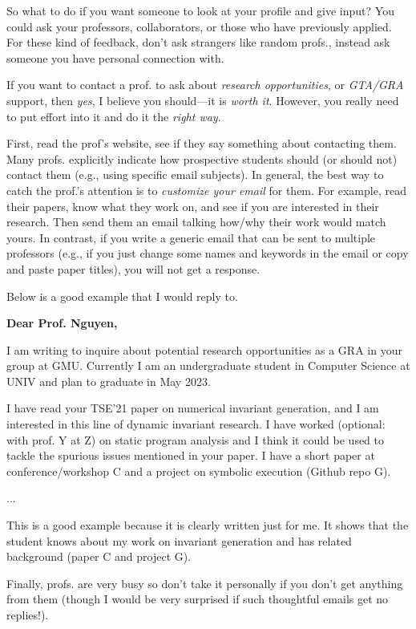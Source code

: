 \documentclass[oneside,11pt]{memoir}
\newenvironment{commentbox}[1][]{
  \small
  \begin{mybox}
    {\small \textbf{#1}}
  }{
  \end{mybox}
}
\begin{document}
So what to do if you want someone to look at your profile and give input? You could ask your professors, collaborators, or those who have previously applied. For these kind of feedback,  don't ask strangers like random profs., instead ask someone you have personal connection with.  

If you want to contact a prof. to ask about \emph{research opportunities}, or \emph{GTA/GRA} support, then \emph{yes}, I believe you should---it is \emph{worth it}. However, you really need to put effort into it and do it the \emph{right way}.

First, read the prof's website, see if they say something about contacting them. Many profs. explicitly indicate how prospective students should (or should not) contact them (e.g., using specific email subjects).
In general, the best way to catch the prof.'s attention is to \emph{customize your email} for them.  For example, read their papers, know what they work on, and see if you are interested in their research. Then send them an email talking how/why their work would match yours.
In contrast, if you write a generic email that can be sent to multiple professors (e.g., if you just change some names and keywords in the email or copy and paste paper titles), you will not get a response.

Below is a good example that I would reply to.   

\begin{commentbox}[Dear Prof. Nguyen,]

  I am writing to inquire about potential research opportunities as a GRA in your group at GMU. Currently I am an undergraduate student in Computer Science at UNIV and plan to graduate in May 2023.


  I have read your TSE'21 paper on numerical invariant generation, and I am interested in this line of dynamic invariant research. I have worked (optional: with prof. Y at Z) on static program analysis and I think it could be used to tackle the spurious issues mentioned in your paper. I have a short paper at conference/workshop C and a project on symbolic execution (Github repo G).

  ...

  This is a good example because it is clearly written just for me.  It shows that the student knows about my work on invariant generation and has related  background (paper C and project G).
\end{commentbox}

Finally, profs. are very busy so don't take it personally if you don't get anything from them (though I would be very surprised if such thoughtful emails get no replies!). 
\end{document}
